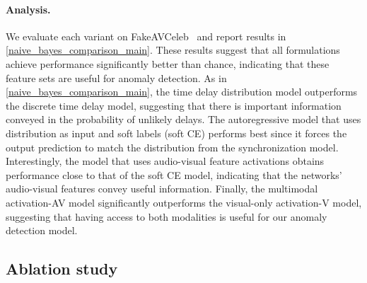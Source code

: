 \documentclass[10pt,twocolumn,letterpaper]{article}
\newcommand{\mypar}[1]{\vspace{-3mm}\paragraph{#1}}
\begin{document}
\mypar{Analysis.} We evaluate each variant on FakeAVCeleb~\cite{NEURIPS_DATASETS_AND_BENCHMARKS2021_d9d4f495} and report results in \cref{naive_bayes_comparison_main}. These results suggest that all formulations achieve performance significantly better than chance, indicating that these feature sets are useful for anomaly detection. As in \cref{naive_bayes_comparison_main}, the time delay distribution model outperforms the discrete time delay model, suggesting that there is important information conveyed in the probability of unlikely delays. The autoregressive model that uses distribution as input and soft labels (soft CE) performs best since it forces the output prediction to match the distribution from the synchronization model. Interestingly, the model that uses audio-visual feature activations obtains performance close to that of the soft CE model, indicating that the networks' audio-visual features convey useful information.  Finally, the multimodal activation-AV model significantly outperforms the visual-only activation-V model, suggesting that having access to both modalities is useful for our anomaly detection model.






 







\subsection{Ablation study}
\end{document}
